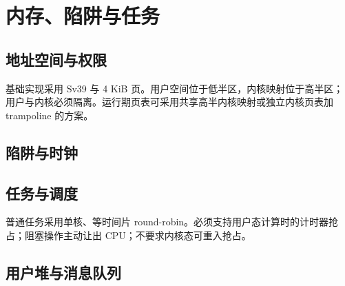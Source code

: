 \chapter{内存、陷阱与任务}

\section{地址空间与权限}
基础实现采用 Sv39 与 4 KiB 页。用户空间位于低半区，内核映射位于高半区；用户与内核必须隔离。运行期页表可采用共享高半内核映射或独立内核页表加 trampoline 的方案。

\section{陷阱与时钟}

\section{任务与调度}
普通任务采用单核、等时间片 round-robin。必须支持用户态计算时的计时器抢占；阻塞操作主动让出 CPU；不要求内核态可重入抢占。

\section{用户堆与消息队列}
